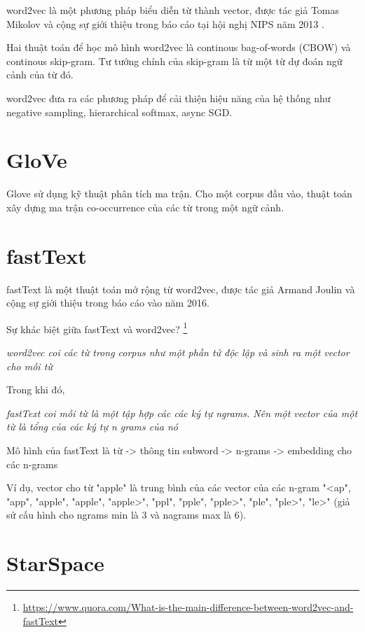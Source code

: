\documentclass[11pt,a4paper]{article}
\begin{document}
word2vec là một phương pháp biểu diễn từ thành vector, được tác giả Tomas Mikolov và cộng sự giới thiệu trong báo cáo tại hội nghị NIPS năm 2013 \cite{DBLP:conf/nips/MikolovSCCD13}.

Hai thuật toán để học mô hình word2vec là continous bag-of-words (CBOW) và continous skip-gram. Tư tưởng chính của skip-gram là từ một từ dự đoán ngữ cảnh của từ đó.

word2vec đưa ra các phương pháp để cải thiện hiệu năng của hệ thống như negative sampling, hierarchical softmax, async SGD.

\section{GloVe}

Glove \cite{DBLP:conf/emnlp/PenningtonSM14} sử dụng kỹ thuật phân tích ma trận. Cho một corpus đầu vào, thuật toán xây dựng ma trận co-occurrence của các từ trong một ngữ cảnh.

\section{fastText}

fastText \cite{DBLP:conf/eacl/GraveMJB17} là một thuật toán mở rộng từ word2vec, được tác giả Armand Joulin  và cộng sự giới thiệu trong báo cáo vào năm 2016.

\noindent Sự khác biệt giữa fastText và word2vec? \footnote{\href{https://www.quora.com/What-is-the-main-difference-between-word2vec-and-fastText}{https://www.quora.com/What-is-the-main-difference-between-word2vec-and-fastText}}

\textit{word2vec coi các từ trong corpus như một phần tử độc lập và sinh ra một vector cho mỗi từ}

\noindent Trong khi đó,

\textit{fastText coi mỗi từ là một tập hợp các các ký tự ngrams. Nên một vector của một từ là tổng của các ký tự n grams của nó}

Mô hình của fastText là từ -> thông tin subword -> n-grams -> embedding cho các n-grams

Ví dụ, vector cho từ "apple" là trung bình của các vector của các n-gram "<ap", "app", "apple", "apple", "apple>", "ppl", "pple", "pple>", "ple", "ple>", "le>" (giả sử cấu hình cho ngrams min là 3 và nagrams max là 6).

\section{StarSpace}
\end{document}

